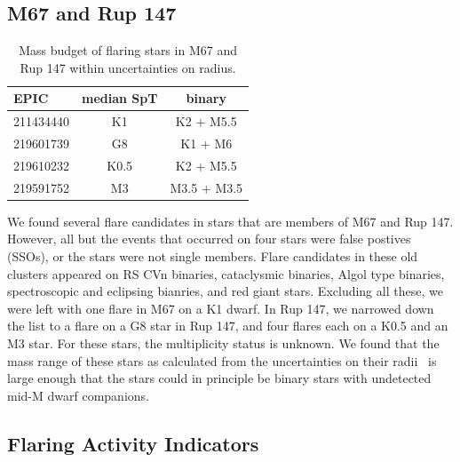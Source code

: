 \documentclass{aa}
\begin{document}
\subsection{M67 and Rup 147}
\begin{table}
\caption{Mass budget of flaring stars in M67 and Rup 147 within uncertainties on radius.}
\begin{tabular}{lcc}
\hline
 EPIC & median SpT &     binary \\
\hline
 211434440 &         K1 &    K2 + M5.5 \\
 219601739 &         G8 &      K1 + M6 \\
 219610232 &       K0.5 &    K2 + M5.5 \\
 219591752 &         M3 &  M3.5 + M3.5 \\
\hline
\end{tabular}
\end{table}
We found several flare candidates in stars that are members of M67 and Rup 147. However, all but the events that occurred on four stars were false postives (SSOs), or the stars were not single members. Flare candidates in these old clusters appeared on RS CVn binaries, cataclysmic binaries, Algol type binaries, spectroscopic and eclipsing bianries, and red giant stars. Excluding all these, we were left with one flare in M67 on a K1 dwarf. In Rup 147, we narrowed down the list to a flare on a G8 star in Rup 147, and four flares each on a K0.5 and an M3 star. For these stars, the multiplicity status is unknown. We found that the mass range of these stars as calculated from the uncertainties on their radii~\citep{eker2018} is large enough that the stars could in principle be binary stars with undetected mid-M dwarf companions.  
\subsection{Flaring Activity Indicators}
\end{document}
